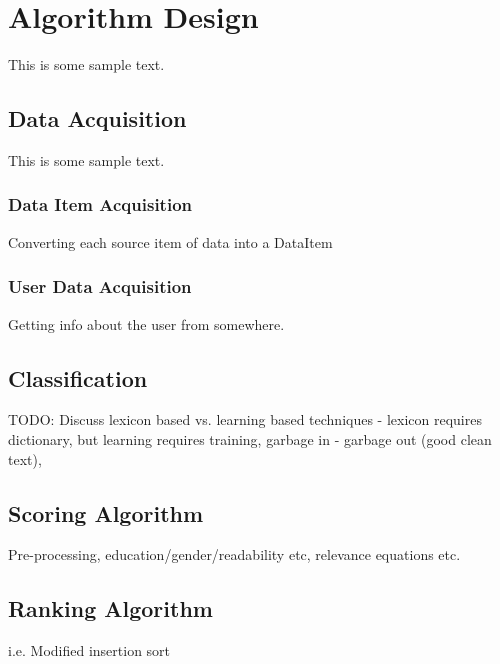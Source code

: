 \chapter{Algorithm Design}

This is some sample text.

\section{Data Acquisition}

This is some sample text.

\subsection{Data Item Acquisition}

Converting each source item of data into a DataItem

\subsection{User Data Acquisition}

Getting info about the user from somewhere.

\section{Classification}
TODO: Discuss lexicon based vs. learning based techniques - lexicon requires dictionary, but learning requires training, garbage in - garbage out (good clean text), 

\section{Scoring Algorithm}

Pre-processing, education/gender/readability etc, relevance equations etc.

\section{Ranking Algorithm}

i.e. Modified insertion sort